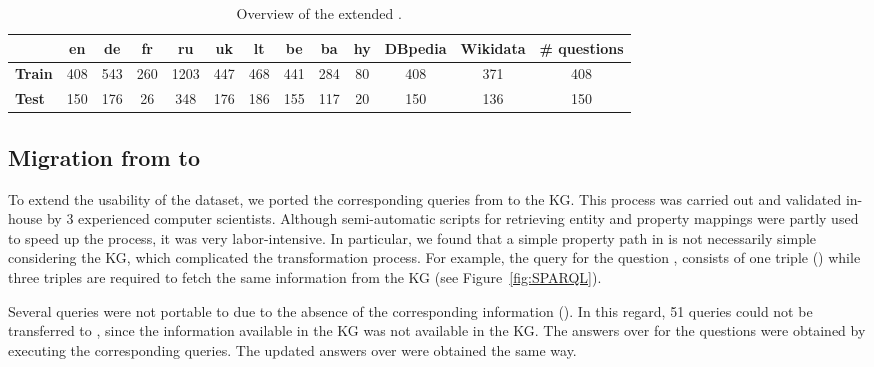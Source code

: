 \documentclass[conference]{IEEEtran}
\begin{document}
\begin{table*}[t]
\centering
  \caption{Overview of the extended \QALDplus.}
  \label{tab:qald_plus_overview}
\begin{tabular}{|l|c|c|c|c|c|c|c|c|c|c|c|c|}
\hline
               & \textbf{en} & \textbf{de} & \textbf{fr} & \textbf{ru} & \textbf{uk} & \textbf{lt} & \textbf{be} & \textbf{ba} & \textbf{hy} & \textbf{DBpedia} & \textbf{Wikidata} & \textbf{\# questions} \\ \hline
\textbf{Train} & 408         & 543         & 260          & 1203        & 447         & 468         & 441         & 284         & 80          & 408              & 371               & 408                   \\ \hline
\textbf{Test}  & 150         & 176         & 26          & 348         & 176         & 186         & 155         & 117         & 20          & 150              & 136               & 150                   \\ \hline
\end{tabular}
\end{table*}


\subsection{Migration from \DBpedia to \Wikidata}


To extend the usability of the dataset, we ported the corresponding  queries from \DBpedia to the \Wikidata KG. 
This process was carried out and validated in-house by 3 experienced computer scientists.
Although semi-automatic scripts for retrieving entity and property mappings were partly used to speed up the process, it was very labor-intensive.
In particular, we found that a simple property path in \DBpedia is not necessarily simple considering the \Wikidata KG, which complicated the transformation process.
For example, the \DBpedia query for the question , consists of one triple (\DBpedia) while three triples are required to fetch the same information from the \Wikidata KG (see Figure~\ref{fig:SPARQL}).

Several \DBpedia \SPARQL queries were not portable to \Wikidata due to the absence of the corresponding information (\eg {}).
In this regard, 51 queries could not be transferred to \Wikidata, since the information available in the \DBpedia KG was not available in the \Wikidata KG. 
The  answers over \Wikidata for the questions were obtained by executing the corresponding \SPARQL queries. 
The updated  answers over \DBpedia were obtained the same way.
\end{document}

